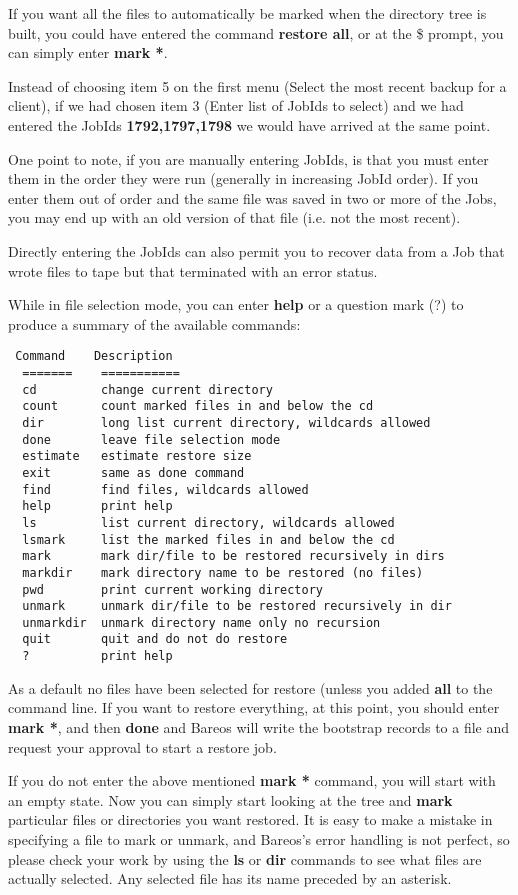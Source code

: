 If you want all the files to automatically be marked when the directory
tree is built, you could have entered the command {\bf restore all}, or
at the \$ prompt, you can simply enter {\bf mark *}.

Instead of choosing item 5 on the first menu (Select the most recent backup
for a client), if we had chosen item 3 (Enter list of JobIds to select) and we
had entered the JobIds {\bf 1792,1797,1798} we would have arrived at the same
point.

One point to note, if you are manually entering JobIds, is that you must enter
them in the order they were run (generally in increasing JobId order). If you
enter them out of order and the same file was saved in two or more of the
Jobs, you may end up with an old version of that file (i.e. not the most
recent).

Directly entering the JobIds can also permit you to recover data from
a Job that wrote files to tape but that terminated with an error status.

While in file selection mode, you can enter {\bf help} or a question mark (?)
to produce a summary of the available commands:

\footnotesize
\begin{verbatim}
 Command    Description
  =======    ===========
  cd         change current directory
  count      count marked files in and below the cd
  dir        long list current directory, wildcards allowed
  done       leave file selection mode
  estimate   estimate restore size
  exit       same as done command
  find       find files, wildcards allowed
  help       print help
  ls         list current directory, wildcards allowed
  lsmark     list the marked files in and below the cd
  mark       mark dir/file to be restored recursively in dirs
  markdir    mark directory name to be restored (no files)
  pwd        print current working directory
  unmark     unmark dir/file to be restored recursively in dir
  unmarkdir  unmark directory name only no recursion
  quit       quit and do not do restore
  ?          print help
\end{verbatim}
\normalsize

As a default no files have been selected for restore (unless you
added {\bf all} to the command line. If you want to restore
everything, at this point, you should enter {\bf mark *}, and then {\bf done}
and Bareos will write the bootstrap records to a file and request your
approval to start a restore job.

If you do not enter the above mentioned {\bf mark *} command, you will start
with an empty state. Now you can simply start looking at the tree and {\bf
mark} particular files or directories you want restored. It is easy to make
a mistake in specifying a file to mark or unmark, and Bareos's error handling
is not perfect, so please check your work by using the {\bf ls} or {\bf dir}
commands to see what files are actually selected. Any selected file has its
name preceded by an asterisk.

